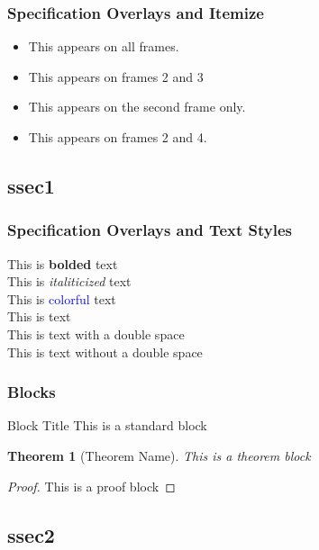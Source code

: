 \documentclass{beamer}
\newtheorem{thm}{Theorem}
\begin{document}
    \begin{frame}
        \frametitle{Specification Overlays and Itemize}
        \begin{itemize}
            \item<1-> This appears on all frames.
            \item<2-3> This appears on frames 2 and 3
            \item<2> This appears on the second frame only.
            \item<2,4> This appears on frames 2 and 4.
        \end{itemize}
    \end{frame}
    \subsection{ssec1}
    \begin{frame}
        \frametitle{Specification Overlays and Text Styles}
        This is \textbf<2>{bolded} text\\
        This is \textit<2>{italiticized} text\\
        This is \textcolor<2>{blue}{colorful} text\\
        This is  text\\
        This is \only<2>{appearing} text with a double space\\
        This is text without a double space\\
    \end{frame}

    \begin{frame}
        \frametitle{Blocks}

        \begin{block}{Block Title}
            This is a standard block
        \end{block}

        \begin{thm}[Theorem Name]
            This is a theorem block
        \end{thm}

        \begin{proof}
            This is a proof block
        \end{proof}
    \end{frame}
    \subsection{ssec2}
    \begin{frame}
    \end{frame}
\end{document}
